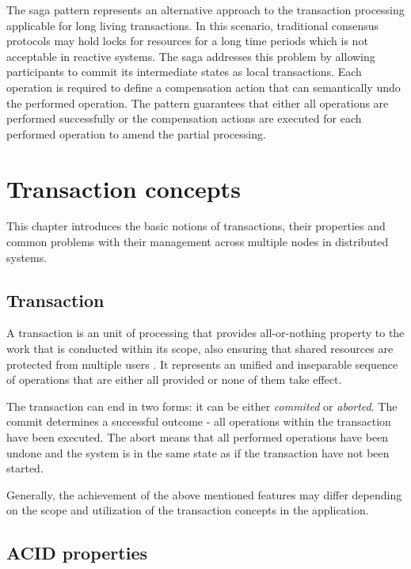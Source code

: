 \documentclass[oneside,
  digital, %
  table,   %
  nolof,     %
  nolot,     %
]{fithesis3}
\begin{document}
The saga pattern \cite{sagas_publ} represents an alternative approach to the transaction processing applicable for long living transactions. In this scenario, traditional consensus protocols may hold locks for resources for a long time periods which is not acceptable in reactive systems. The saga addresses this problem by allowing participants to commit its intermediate states as local transactions. Each operation is required to define a compensation action that can semantically undo the performed operation. The pattern guarantees that either all operations are performed successfully or the compensation actions are executed for each performed operation to amend the partial processing.

\clearpage
\chapter{Transaction concepts}

This chapter introduces the basic notions of transactions, their properties and common problems with their management across multiple nodes in distributed systems. 

\section{Transaction}

A transaction is an unit of processing that provides all-or-nothing property to the work that is conducted within its scope, also ensuring that shared resources are protected from multiple users \cite{java_tran_processing}. It represents an unified and inseparable sequence of operations that are either all provided or none of them take effect. 

The transaction can end in two forms: it can be either \textit{commited} or \textit{aborted}. The commit determines a successful outcome - all operations within the transaction have been executed. The abort means that all performed operations have been undone and the system is in the same state as if the transaction have not been started.

Generally, the achievement of the above mentioned features may differ depending on the scope and utilization of the transaction concepts in the application.

\section{ACID properties}
\end{document}
